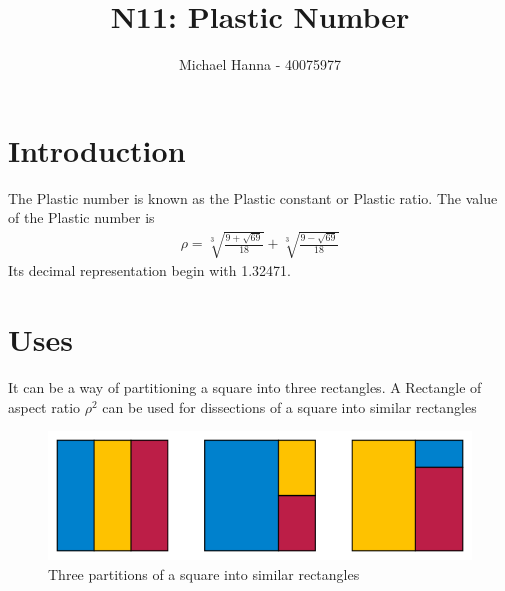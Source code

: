 \documentclass{article}
\title{N11: Plastic Number}
\author{Michael Hanna - 40075977 }
\date{}
\begin{document}
\maketitle

\section{Introduction}
The Plastic number is known as the Plastic constant or Plastic ratio.\newline
\newline The value of the Plastic number is
\begin{eqnarray}
{\displaystyle \rho ={\sqrt[{3}]{\frac {9+{\sqrt {69}}}{18}}}+{\sqrt[{3}]{\frac {9-{\sqrt {69}}}{18}}}}
\end{eqnarray}
\newline Its decimal representation begin with 1.32471.\citep{pn}
\section{Uses}
It can be a way of partitioning a square into three rectangles.\newline
\newline A Rectangle of aspect ratio ${\rho}^2$  can be used for dissections of a square into similar rectangles \citep{pn}


\begin{figure}[h!]
\centering
\includegraphics[scale=0.5]{square}
\caption{Three partitions of a square into similar rectangles}
\label{fig:squares}
\end{figure}




\end{document}
